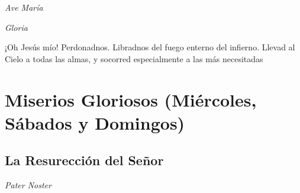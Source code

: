 \documentclass[a4paper,11pt, oneside]{report}
\begin{document}
        \textit{Ave María} \par
        \indent\textit{Gloria} \par
        \indent¡Oh Jesús mío! Perdonadnos. Libradnos del fuego enterno del infierno. Llevad al Cielo a todas las almas, y socorred especialmente a las más 
        necesitadas
        
    \section*{Miserios Gloriosos (Miércoles, Sábados y Domingos)}
      \subsection*{La Resurección del Señor}
      
        \textit{Pater Noster}
\end{document}
